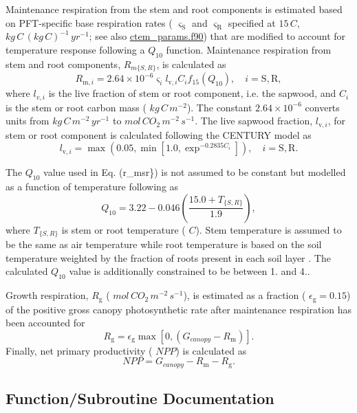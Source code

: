Maintenance respiration from the stem and root components is estimated based on P\+F\+T-\/specific base respiration rates ( $\varsigma_\mathrm{S}$ and $\varsigma_\mathrm{R}$ specified at $15\,C$, $kg\,C\,(kg\,C)^{-1}\,yr^{-1}$; see also \hyperlink{ctem__params_8f90}{ctem\+\_\+params.\+f90}) that are modified to account for temperature response following a $Q_{10}$ function. Maintenance respiration from stem and root components, $R_{m\{S,R\}}$, is calculated as \[ \label{r_msr} R_{\mathrm{m},i} = 2.64 \times 10^{-6}\varsigma_{i}l_{\mathrm{v}, i}C_{i}f_{15}(Q_{10}),\quad i = \mathrm{S}, \mathrm{R}, \] where $l_{v,i}$ is the live fraction of stem or root component, i.\+e. the sapwood, and $C_i$ is the stem or root carbon mass ( $kg\,C\,m^{-2}$). The constant $2.64 \times 10^{-6}$ converts units from $kg\,C\,m^{-2}\,yr^{-1}$ to $mol\,CO_2\,m^{-2}\,s^{-1}$. The live sapwood fraction, $l_{\mathrm{v},i}$, for stem or root component is calculated following the C\+E\+N\+T\+U\+R\+Y model \cite{Parton1996-zv} as \[ l_{\mathrm{v},i} = \max(0.05, \min[1.0, \exp^{-0.2835 C_i} ]),\quad i = \mathrm{S}, \mathrm{R}. \]

The $Q_{10}$ value used in Eq. (r\+\_\+msr\}) is not assumed to be constant but modelled as a function of temperature following \cite{Tjoelker2001-uz} as \[ Q_{10} = 3.22 - 0.046 \left(\frac{15.0 + T_{\{S,R\}}}{1.9}\right), \] where $T_{\{S,R\}}$ is stem or root temperature ( $C$). Stem temperature is assumed to be the same as air temperature while root temperature is based on the soil temperature weighted by the fraction of roots present in each soil layer \cite{Arora2003838}. The calculated $Q_{10}$ value is additionally constrained to be between 1. and 4..

Growth respiration, $R_\mathrm{g}$ ( $mol\,CO_2\,m^{-2}\,s^{-1}$), is estimated as a fraction ( $\epsilon_\mathrm{g}=0.15$) of the positive gross canopy photosynthetic rate after maintenance respiration has been accounted for \[ \label{growth_res} R_\mathrm{g}=\epsilon_\mathrm{g}\max[0,(G_{canopy} - R_\mathrm{m})]. \] Finally, net primary productivity ( $NPP$) is calculated as \[ NPP = G_{canopy} - R_\mathrm{m} - R_\mathrm{g}. \] 

\subsection{Function/\+Subroutine Documentation}
\hypertarget{mainres_8f_a86c41356a868e2ef9d08ffb14f45aff5}{}
